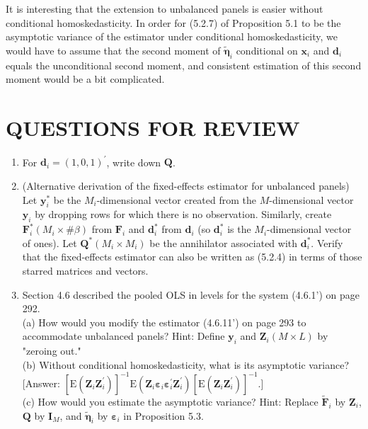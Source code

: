 \documentclass[10pt]{article}
\begin{document}
It is interesting that the extension to unbalanced panels is easier without conditional homoskedasticity. In order for (5.2.7) of Proposition 5.1 to be the asymptotic variance of the estimator under conditional homoskedasticity, we would have to assume that the second moment of $\tilde{\boldsymbol{\eta}}_{i}$ conditional on $\mathbf{x}_{i}$ and $\mathbf{d}_{i}$ equals the unconditional second moment, and consistent estimation of this second moment would be a bit complicated.

\section*{QUESTIONS FOR REVIEW}
\begin{enumerate}
  \item For $\mathbf{d}_{i}=(1,0,1)^{\prime}$, write down $\mathbf{Q}$.
  \item (Alternative derivation of the fixed-effects estimator for unbalanced panels) Let $\mathbf{y}_{i}^{*}$ be the $M_{i}$-dimensional vector created from the $M$-dimensional vector $\mathbf{y}_{i}$ by dropping rows for which there is no observation. Similarly, create $\mathbf{F}_{i}^{*} \left(M_{i} \times \# \beta\right)$ from $\mathbf{F}_{i}$ and $\mathbf{d}_{i}^{*}$ from $\mathbf{d}_{i}$ (so $\mathbf{d}_{i}^{*}$ is the $M_{i}$-dimensional vector of ones). Let $\mathbf{Q}^{*}\left(M_{i} \times M_{i}\right)$ be the annihilator associated with $\mathbf{d}_{i}^{*}$. Verify that the fixed-effects estimator can also be written as (5.2.4) in terms of those starred matrices and vectors.
  \item Section 4.6 described the pooled OLS in levels for the system (4.6.1') on page 292.\\
(a) How would you modify the estimator (4.6.11') on page 293 to accommodate unbalanced panels? Hint: Define $\mathbf{y}_{i}$ and $\mathbf{Z}_{i}(M \times L)$ by "zeroing out."\\
(b) Without conditional homoskedasticity, what is its asymptotic variance? [Answer: $\left[\mathrm{E}\left(\mathbf{Z}_{i} \mathbf{Z}_{i}^{\prime}\right)\right]^{-1} \mathrm{E}\left(\mathbf{Z}_{i} \boldsymbol{\varepsilon}_{i} \boldsymbol{\varepsilon}_{i}^{\prime} \mathbf{Z}_{i}^{\prime}\right)\left[\mathrm{E}\left(\mathbf{Z}_{i} \mathbf{Z}_{i}^{\prime}\right)\right]^{-1}$.]\\
(c) How would you estimate the asymptotic variance? Hint: Replace $\widetilde{\mathbf{F}}_{i}$ by $\mathbf{Z}_{i}$, $\mathbf{Q}$ by $\mathbf{I}_{M}$, and $\tilde{\boldsymbol{\eta}}_{i}$ by $\boldsymbol{\varepsilon}_{i}$ in Proposition 5.3.
\end{enumerate}
\end{document}
